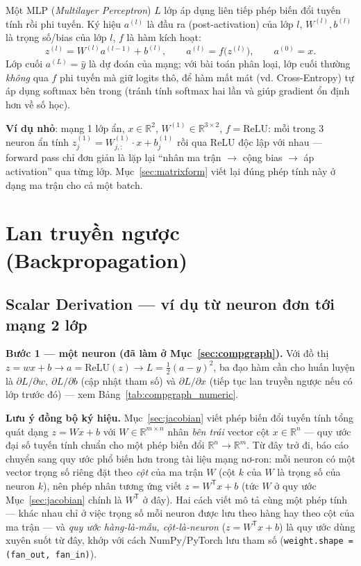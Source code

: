 \documentclass[12pt,a4paper]{report}
\newcommand{\en}[1]{\textit{#1}}
\newcommand{\T}{^{\mathsf{T}}}
\begin{document}
Một MLP (\en{Multilayer Perceptron}) $L$ lớp áp dụng liên tiếp phép biến
đổi tuyến tính rồi phi tuyến. Ký hiệu $a^{(l)}$ là đầu ra (post-activation)
của lớp $l$, $W^{(l)},b^{(l)}$ là trọng số/bias của lớp $l$, $f$ là hàm
kích hoạt:
$$z^{(l)} = W^{(l)}a^{(l-1)} + b^{(l)}, \qquad a^{(l)} = f\big(z^{(l)}\big), \qquad a^{(0)}=x.$$
Lớp cuối $a^{(L)}=\hat y$ là dự đoán của mạng; với bài toán phân loại, lớp
cuối thường \emph{không} qua $f$ phi tuyến mà giữ logits thô, để hàm mất
mát (vd. Cross-Entropy) tự áp dụng softmax bên trong (tránh tính softmax
hai lần và giúp gradient ổn định hơn về số học).

\textbf{Ví dụ nhỏ}: mạng 1 lớp ẩn, $x\in\mathbb R^2$,
$W^{(1)}\in\mathbb R^{3\times2}$, $f=\mathrm{ReLU}$: mỗi trong 3 neuron ẩn
tính $z^{(1)}_j = W^{(1)}_{j,:}\cdot x + b^{(1)}_j$ rồi qua ReLU độc lập
với nhau --- forward pass chỉ đơn giản là lặp lại ``nhân ma trận $\to$ cộng
bias $\to$ áp activation'' qua từng lớp. Mục~\ref{sec:matrixform} viết lại
đúng phép tính này ở dạng ma trận cho cả một batch.

\section{Lan truyền ngược (Backpropagation)}
\label{sec:backprop}

\subsection{Scalar Derivation --- ví dụ từ neuron đơn tới mạng 2 lớp}
\label{sec:scalar}

\textbf{Bước 1 --- một neuron (đã làm ở Mục~\ref{sec:compgraph}).} Với đồ
thị $z=wx+b \to a=\mathrm{ReLU}(z) \to L=\tfrac12(a-y)^2$, ba đạo hàm cần
cho huấn luyện là $\partial L/\partial w,\ \partial L/\partial b$ (cập nhật
tham số) và $\partial L/\partial x$ (tiếp tục lan truyền ngược nếu có lớp
trước đó) --- xem Bảng~\ref{tab:compgraph_numeric}.

\textbf{Lưu ý đồng bộ ký hiệu.} Mục~\ref{sec:jacobian} viết phép biến đổi
tuyến tính tổng quát dạng $z=Wx+b$ với $W\in\mathbb R^{m\times n}$ nhân
\emph{bên trái} vector cột $x\in\mathbb R^n$ --- quy ước đại số tuyến tính
chuẩn cho một phép biến đổi $\mathbb R^n\to\mathbb R^m$. Từ đây trở đi,
báo cáo chuyển sang quy ước phổ biến hơn trong tài liệu mạng nơ-ron: mỗi
neuron có một vector trọng số riêng đặt theo \emph{cột} của ma trận $W$
(cột $k$ của $W$ là trọng số của neuron $k$), nên phép nhân tương ứng viết
$z=W\T x+b$ (tức $W$ ở quy ước Mục~\ref{sec:jacobian} chính là $W\T$ ở đây).
Hai cách viết mô tả cùng một phép tính --- khác nhau chỉ ở việc trọng số
mỗi neuron được lưu theo hàng hay theo cột của ma trận --- và \emph{quy
ước hàng-là-mẫu, cột-là-neuron} ($z=W\T x+b$) là quy ước dùng xuyên suốt
từ đây, khớp với cách NumPy/PyTorch lưu tham số (\texttt{weight.shape =
(fan\_out, fan\_in)}).
\end{document}
